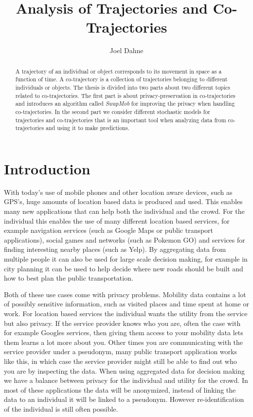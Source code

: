 \documentclass[12pt]{article}
\title{Analysis of Trajectories and Co-Trajectories}
\author{Joel Dahne}
\theoremstyle{definition}
\begin{document}
\maketitle

\tableofcontents

\begin{abstract}
  A trajectory of an individual or object corresponds to its movement
  in space as a function of time. A co-trajectory is a collection of
  trajectories belonging to different individuals or objects. The
  thesis is divided into two parts about two different topics related
  to co-trajectories. The first part is about privacy-preservation in
  co-trajectories and introduces an algorithm called \emph{SwapMob}
  for improving the privacy when handling co-trajectories. In the
  second part we consider different stochastic models for trajectories
  and co-trajectories that is an important tool when analyzing data
  from co-trajectories and using it to make predictions.
\end{abstract}

\section{Introduction}
With today's use of mobile phones and other location aware devices,
such as GPS's, huge amounts of location based data is produced and
used. This enables many new applications that can help both the
individual and the crowd. For the individual this enables the use of
many different location based services, for example navigation
services (such as Google Maps or public transport applications),
social games and networks (such as Pokemon GO) and services for
finding interesting nearby places (such as Yelp). By aggregating data
from multiple people it can also be used for large scale decision
making, for example in city planning it can be used to help decide
where new roads should be built and how to best plan the public
transportation.

Both of these use cases come with privacy problems. Mobility data
contains a lot of possibly sensitive information, such as visited
places and time spent at home or work. For location based services the
individual wants the utility from the service but also privacy. If the
service provider knows who you are, often the case with for example
Googles services, then giving them access to your mobility data lets
them learns a lot more about you. Other times you are communicating
with the service provider under a pseudonym, many public transport
application works like this, in which case the service provider might
still be able to find out who you are by inspecting the data. When
using aggregated data for decision making we have a balance between
privacy for the individual and utility for the crowd. In most of these
applications the data will be anonymized, instead of linking the data
to an individual it will be linked to a pseudonym. However
re-identification of the individual is still often possible.
\end{document}
